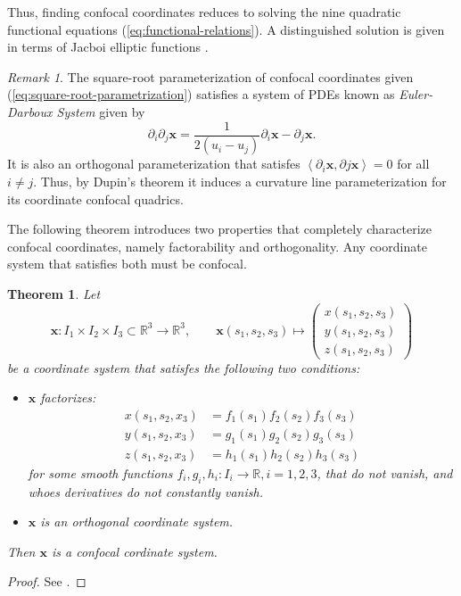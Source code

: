 \documentclass[10pt, a4paper]{article}
\theoremstyle{BoldTopSpacing}
\newtheorem{theorem}{Theorem}[section]
\theoremstyle{BoldTopSpacing}
\theoremstyle{BoldTopSpacing}
\theoremstyle{BoldTopBottomSpacing}
\theoremstyle{BoldTopSpacing}
\theoremstyle{BoldTopBottomSpacing}
\theoremstyle{remark}
\newtheorem{remark}{\textit{Remark}}[section]
\begin{document}
Thus, finding confocal coordinates reduces to solving the nine quadratic functional equations (\ref{eq:functional-relations}). A distinguished solution is given in terms of Jacboi elliptic functions \cite[\textcolor{CitationColor}{P.~102}]{geometryIII}. \par
\begin{remark}
    The square-root parameterization of confocal coordinates given (\ref{eq:square-root-parametrization}) satisfies a system of PDEs known as \textit{Euler-Darboux System} given by
\[
\partial_i \partial_j \boldsymbol{x} = \frac{1}{2 (u_i - u_j)} \partial_i \boldsymbol{x} - \partial_j \boldsymbol{x}.
\]
It is also an orthogonal parameterization that satisfes $\left<{\partial_i \boldsymbol{x}},{\partial j \boldsymbol{x}} \right> = 0$ for all $i \neq j$. Thus, by Dupin's theorem it induces a curvature line parameterization for its coordinate confocal quadrics.
\end{remark}

The following theorem introduces two properties that completely characterize confocal coordinates, namely factorability and orthogonality. Any coordinate system that satisfies both must be confocal.

\begin{theorem}
\label{thm:must-be-confocal}
Let
\[
\boldsymbol{x} : I_{1} \times I_{2} \times I_{3} \subset \mathbb{R}^3 \to \mathbb{R}^3, \quad \quad \boldsymbol{x}(s_{1}, s_{2}, s_{3}) \mapsto \begin{pmatrix}
x(s_{1}, s_{2}, s_{3}) \\
y(s_{1}, s_{2}, s_{3}) \\
z(s_{1}, s_{2}, s_{3})
\end{pmatrix}
\]
be a coordinate system that satisfes the following two conditions:
\begin{itemize}
    \item[(i)] $\boldsymbol{x}$ factorizes:
        \begin{align*}
            x(s_1, s_2, x_3) &= f_1(s_1) f_2(s_2) f_{3}(s_3) \\
            y(s_1, s_2, x_3) &= g_1(s_1) g_2(s_2) g_{3}(s_3) \\
            z(s_1, s_2, x_3) &= h_1(s_1) h_2(s_2) h_{3}(s_3)
        \end{align*}
        for some smooth functions $f_i, g_i, h_i : I_i \to \mathbb{R}, i = 1, 2, 3$, that do not vanish, and whoes derivatives do not constantly vanish.
    \item[(ii)] $\boldsymbol{x}$ is an orthogonal coordinate system.
\end{itemize}
Then $\boldsymbol{x}$ is a confocal cordinate system.
\end{theorem}
\begin{proof}
See \cite{DiscretizationConfocalQuadricsI}.
\end{proof}
\pagebreak
\end{document}
